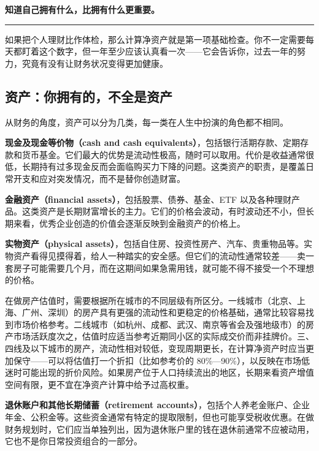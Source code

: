 \documentclass[a4paper,11pt,oneside,fontset=none,UTF8,zihao=-4]{ctexbook}
\begin{document}
\begin{dhquote}
\textbf{知道自己拥有什么，比拥有什么更重要。}
\end{dhquote}

\begin{center}{\color{dh-bronze}\rule{0.2\textwidth}{0.5pt}}\end{center}

如果把个人理财比作体检，那么计算净资产就是第一项基础检查。你不一定需要每天都盯着这个数字，但一年至少应该认真看一次------它会告诉你，过去一年的努力，究竟有没有让财务状况变得更加健康。

\subsection{资产：你拥有的，不全是资产}\label{ux8d44ux4ea7ux4f60ux62e5ux6709ux7684ux4e0dux5168ux662fux8d44ux4ea7}

从财务的角度，资产可以分为几类，每一类在人生中扮演的角色都不相同。

\textbf{现金及现金等价物（cash and cash
equivalents）}，包括银行活期存款、定期存款和货币基金。它们最大的优势是流动性极高，随时可以取用。代价是收益通常很低，长期持有过多现金反而会面临购买力下降的问题。这类资产的职责，是覆盖日常开支和应对突发情况，而不是替你创造财富。

\textbf{金融资产（financial assets）}，包括股票、债券、基金、ETF
以及各种理财产品。这类资产是长期财富增长的主力。它们的价格会波动，有时波动还不小，但长期来看，优秀企业创造的价值会逐渐反映到金融资产的价格上。

\textbf{实物资产（physical
assets）}，包括自住房、投资性房产、汽车、贵重物品等。实物资产看得见摸得着，给人一种踏实的安全感。但它们的流动性通常较差------卖一套房子可能需要几个月，而在这期间如果急需用钱，就可能不得不接受一个不理想的价格。

在做房产估值时，需要根据所在城市的不同层级有所区分。一线城市（北京、上海、广州、深圳）的房产具有更强的流动性和更稳定的价格基础，通常比较容易找到市场价格参考。二线城市（如杭州、成都、武汉、南京等省会及强地级市）的房产市场活跃度次之，估值时应适当参考近期同小区的实际成交价而非挂牌价。三、四线及以下城市的房产，流动性相对较低，变现周期更长，在计算净资产时应当更加保守------可以将估值打一个折扣（比如参考价的
80\%---90\%），以反映在市场低迷时可能出现的折价风险。如果房产位于人口持续流出的地区，长期来看资产增值空间有限，更不宜在净资产计算中给予过高权重。

\textbf{退休账户和其他长期储蓄（retirement
accounts）}，包括个人养老金账户、企业年金、公积金等。这些资金通常有特定的提取限制，但也可能享受税收优惠。在做财务规划时，它们应当单独列出，因为退休账户里的钱在退休前通常不应被动用，它也不是你日常投资组合的一部分。
\end{document}
